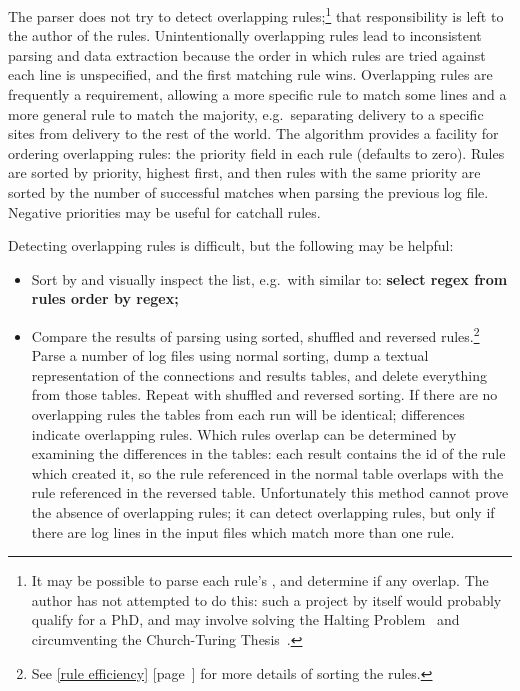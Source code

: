 \documentclass[a4paper,12pt,draft]{article}
\newcommand{\refwithpage}[1]{%
    \empty{}\ref{#1} [page~\pageref{#1}]%
}
\newcommand{\sectionref}[1]{%
    \textsection{}\refwithpage{#1}%
}
\begin{document}
The parser does not try to detect overlapping rules;\footnote{It may be
possible to parse each rule's \regex{}, and determine if any overlap.  The
author has not attempted to do this: such a project by itself would
probably qualify for a PhD, and may involve solving the Halting
Problem~\cite{Wikipedia-halting-problem} and circumventing the
Church-Turing Thesis~\cite{Wikipedia-church-turing-thesis}.} that
responsibility is left to the author of the rules.  Unintentionally
overlapping rules lead to inconsistent parsing and data extraction because
the order in which rules are tried against each line is unspecified, and
the first matching rule wins.  Overlapping rules are frequently a
requirement, allowing a more specific rule to match some lines and a more
general rule to match the majority, e.g.\ separating \SMTP{} delivery to a
specific sites from \SMTP{} delivery to the rest of the world.  The
algorithm provides a facility for ordering overlapping rules: the priority
field in each rule (defaults to zero).  Rules are sorted by priority,
highest first, and then rules with the same priority are sorted by the
number of successful matches when parsing the previous log file.  Negative
priorities may be useful for catchall rules.

Detecting overlapping rules is difficult, but the following may be helpful:

\begin{itemize}

    \item Sort by \regex{} and visually inspect the list, e.g.\ with \SQL{}
        similar to: \textbf{select regex from rules order by regex;}

    \item Compare the results of parsing using sorted, shuffled and
        reversed rules.\footnote{See \sectionref{rule efficiency} for more
        details of sorting the rules.}  Parse a number of log files using
        normal sorting, dump a textual representation of the connections
        and results tables, and delete everything from those tables.
        Repeat with shuffled and reversed sorting.  If there are no
        overlapping rules the tables from each run will be identical;
        differences indicate overlapping rules.  Which rules overlap can be
        determined by examining the differences in the tables: each result
        contains the id of the rule which created it, so the rule
        referenced in the normal table overlaps with the rule referenced in
        the reversed table.  Unfortunately this method cannot prove the
        absence of overlapping rules; it can detect overlapping rules, but
        only if there are log lines in the input files which match more
        than one rule.

\end{itemize}
\end{document}

